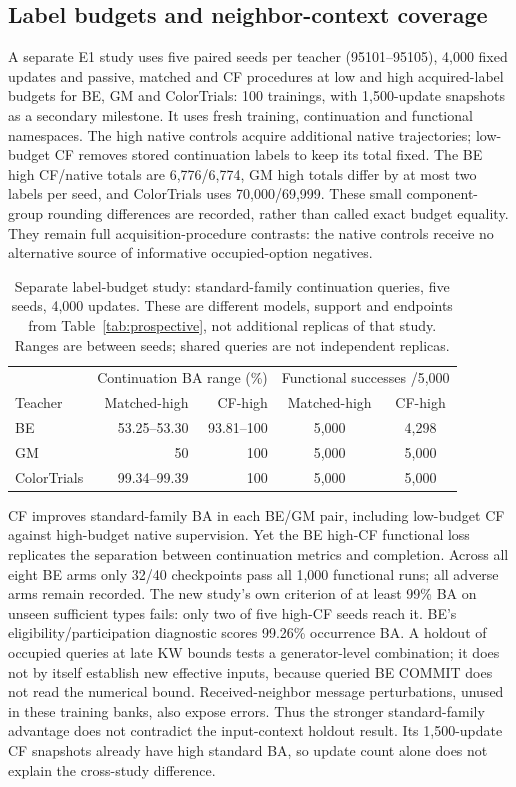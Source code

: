 \subsection{Label budgets and neighbor-context coverage}\label{sec:additional}
A separate E1 study uses five paired seeds per teacher (95101--95105),
4,000 fixed updates and passive, matched and CF procedures at low and high
acquired-label budgets for BE, GM and ColorTrials: 100 trainings, with
1,500-update snapshots as a secondary milestone. It uses fresh training,
continuation and functional namespaces. The high native controls acquire
additional native trajectories; low-budget CF removes stored continuation
labels to keep its total fixed. The BE high CF/native totals are
6,776/6,774, GM high totals differ by at most two labels per seed, and
ColorTrials uses 70,000/69,999. These small component-group rounding
differences are recorded, rather than called exact budget equality.
They remain full acquisition-procedure contrasts: the native controls
receive no alternative source of informative occupied-option negatives.

\begin{table}[htbp]\centering\small
\begin{tabular}{lrrcc}
\toprule & \multicolumn{2}{c}{Continuation BA range (\%)} &
\multicolumn{2}{c}{Functional successes /5,000} \\
Teacher & Matched-high & CF-high & Matched-high & CF-high \\
\midrule
BE & 53.25--53.30 & 93.81--100 & 5,000 & 4,298 \\
GM & 50 & 100 & 5,000 & 5,000 \\
ColorTrials & 99.34--99.39 & 100 & 5,000 & 5,000 \\
\bottomrule
\end{tabular}
\caption{Separate label-budget study: standard-family continuation queries,
five seeds, 4,000 updates. These are different models, support and endpoints
from Table~\ref{tab:prospective}, not additional replicas of that study.
Ranges are between seeds; shared queries are not independent replicas.}
\label{tab:additional}
\end{table}

CF improves standard-family BA in each BE/GM pair, including low-budget CF
against high-budget native supervision. Yet the BE high-CF functional loss
replicates the separation between continuation metrics and completion.
Across all eight BE arms only 32/40 checkpoints pass all 1,000 functional
runs; all adverse arms remain recorded. The new study's own criterion of
at least 99\% BA on unseen sufficient types fails: only two of five high-CF
seeds reach it. BE's eligibility/participation diagnostic scores 99.26\%
occurrence BA. A holdout of occupied queries at late KW bounds tests a
generator-level combination; it does not by itself establish new effective
inputs, because queried BE COMMIT does not read the numerical bound.
Received-neighbor message perturbations, unused in these training banks,
also expose errors. Thus the stronger standard-family advantage does not
contradict the input-context holdout result. Its 1,500-update CF snapshots
already have high standard BA, so update count alone does not explain the
cross-study difference.

